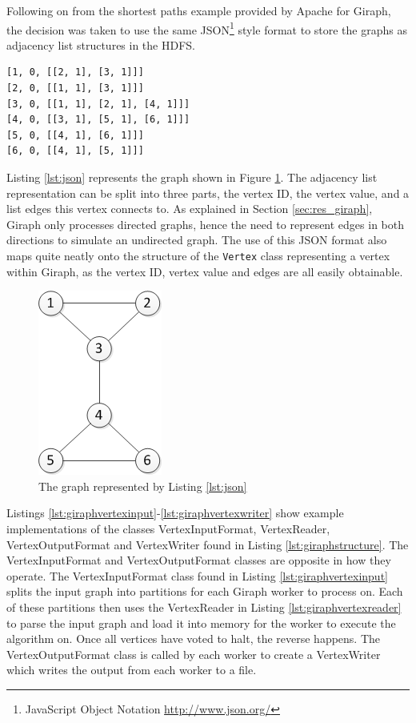 Following on from the shortest paths example \cite{giraphexample} provided by Apache for Giraph, the decision was taken to use the same JSON\footnote{JavaScript Object Notation \url{http://www.json.org/}} style format to store the graphs as adjacency list structures in the HDFS.

\begin{lstlisting}[float]
[1, 0, [[2, 1], [3, 1]]]
[2, 0, [[1, 1], [3, 1]]]
[3, 0, [[1, 1], [2, 1], [4, 1]]]
[4, 0, [[3, 1], [5, 1], [6, 1]]]
[5, 0, [[4, 1], [6, 1]]]
[6, 0, [[4, 1], [5, 1]]]
\end{lstlisting}

Listing \ref{lst:json} represents the graph shown in Figure \ref{fig:json}. The adjacency list representation can be split into three parts, the vertex ID, the vertex value, and a list edges this vertex connects to. As explained in Section \ref{sec:res_giraph}, Giraph only processes directed graphs, hence the need to represent edges in both directions to simulate an undirected graph. The use of this JSON format also maps quite neatly onto the structure of the \verb/Vertex/ class representing a vertex within Giraph, as the vertex ID, vertex value and edges are all easily obtainable.

\begin{figure}[htbp]
  \centering
    \includegraphics{./img/json}
  \caption{The graph represented by Listing \ref{lst:json}}
  \label{fig:json}
\end{figure}

Listings \ref{lst:giraphvertexinput}-\ref{lst:giraphvertexwriter} show example
implementations of the classes VertexInputFormat, VertexReader,
VertexOutputFormat and VertexWriter found in Listing \ref{lst:giraphstructure}.
The VertexInputFormat and VertexOutputFormat classes are opposite in how they
operate. The VertexInputFormat class found in Listing
\ref{lst:giraphvertexinput} splits the input graph into partitions for each
Giraph worker to process on. Each of these partitions then uses the
VertexReader in Listing \ref{lst:giraphvertexreader} to parse the input graph
and load it into memory for the worker to execute the algorithm on. Once all
vertices have voted to halt, the reverse happens. The VertexOutputFormat class
is called by each worker to create a VertexWriter which writes the output from
each worker to a file.

